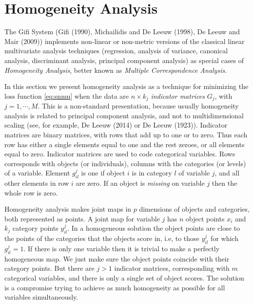 \documentclass[
  12pt,
]{article}
\begin{document}
\section{Homogeneity Analysis}\label{hom}

The Gifi System (Gifi (1990), Michailidis and De Leeuw (1998), De Leeuw and Mair (2009)) implements non-linear or non-metric versions of the classical linear multivariate analysis techniques (regression, analysis of variance, canonical analysis, discriminant analysis, principal component analysis) as special cases of \emph{Homogeneity Analysis}, better known as \emph{Multiple Correspondence Analysis}.

In this section we present homogeneity analysis as a technique for
minimizing the loss function \eqref{eq:snmu} when the data are \(n\times k_j\) \emph{indicator matrices} \(G_j\), with \(j=1,\cdots,M\). This is a non-standard
presentation, because usually homogeneity analysis is related to
principal component analysis, and not to multidimensional scaling
(see, for example, De Leeuw (2014) or De Leeuw (1923)).
Indicator matrices are binary matrices, with rows that add up to one or to zero.
Thus each row has either a single elements equal to one and the rest zeroes,
or all elements equal to zero. Indicator matrices are
used to code categorical variables. Rows corresponds with objects
(or individuals), columns with the categories (or levels) of a variable.
Element \(g_{il}^j\) is one if object \(i\) is in category \(l\) of variable \(j\),
and all other elements in row \(i\) are zero. If an object is \emph{missing} on
variable \(j\) then the whole row is zero.

Homogeneity analysis makes joint maps in \(p\) dimensions of objects
and categories, both represented as points. A joint map for variable \(j\)
has \(n\) object points \(x_i\) and \(k_j\) category points \(y^j_{il}\).
In a homogeneous solution the object points are close to the points of the categories that the objects score in, i.e, to those \(y^j_{il}\) for which \(g^j_{il}=1\).
If there is only one variable then it is trivial to make a perfectly
homogeneous map. We just make sure the object points coincide with
their category points. But there are \(j>1\) indicator matrices, corresponding with \(m\) categorical variables, and there is only a single set of object scores. The solution is a compromise trying to achieve as much homogeneity as possible for all variables simultaneously.
\end{document}
